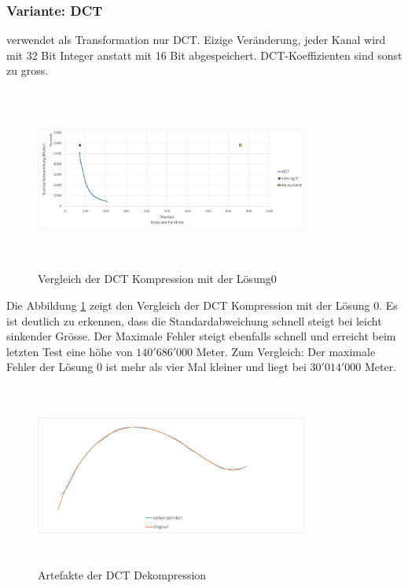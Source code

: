\subsubsection{Variante: DCT}\label{resultate:dct}
verwendet als Transformation nur DCT. Eizige Veränderung, jeder Kanal wird mit 32 Bit Integer anstatt mit 16 Bit abgespeichert. DCT-Koeffizienten sind sonst zu gross.
\begin{figure}[!htbp]
	\center
	\includegraphics[width=0.8\textwidth,height=6cm,keepaspectratio]{./pictures/resultate/loesung1/loesung1-0/loesung1_0.png}
	\caption{Vergleich der DCT Kompression mit der Lösung0}
	\label{resultate:loesung1:dct:resultate}
\end{figure}
Die Abbildung \ref{resultate:loesung1:dct:resultate} zeigt den Vergleich der DCT Kompression mit der Lösung 0. Es ist deutlich zu erkennen, dass die Standardabweichung schnell steigt bei leicht sinkender Grösse. Der Maximale Fehler steigt ebenfalls schnell und erreicht beim letzten Test eine höhe von $140'686'000$ Meter. Zum Vergleich: Der maximale Fehler der Lösung 0 ist mehr als vier Mal kleiner und liegt bei $30'014'000$ Meter.\\
\begin{figure}[!htbp]
	\center
	\includegraphics[width=0.8\textwidth,height=6cm,keepaspectratio]{./pictures/resultate/loesung1/loesung1-0/loesung1_0_artefakte.png}
	\caption{Artefakte der DCT Dekompression}
	\label{resultate:loesung1:dct:artefakte}
\end{figure}
